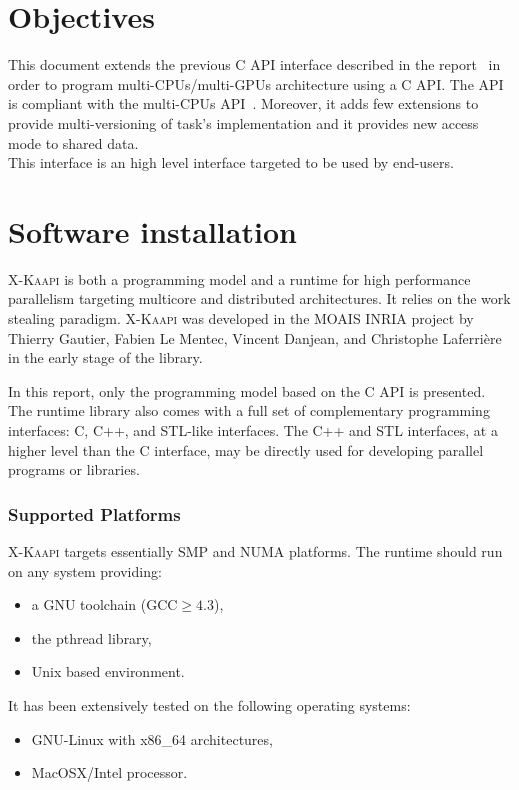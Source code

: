 \documentclass[a4paper, 11pt]{article}
\newcommand{\kaapi}{\textsc{X-Kaapi}\xspace}
\begin{document}
\makeRT %

\tableofcontents
{}

\newpage
\section*{Objectives}\label{sec:objectives}
This document extends the previous C API interface described in the report~\cite{apic} in order to program multi-CPUs/multi-GPUs architecture using a C API. The API is compliant with the multi-CPUs API~\cite{apic}. Moreover, it adds few extensions to provide multi-versioning of task's implementation and it provides new access mode to shared data.\\

This interface is an high level interface targeted to be used by end-users.

\newpage
\section{Software installation}\label{sec:userinstall}

\kaapi is both a programming model and a runtime for high performance parallelism targeting multicore and distributed architectures. 
It relies on the work stealing paradigm.
\kaapi was developed in the MOAIS INRIA project by Thierry Gautier, Fabien Le Mentec, Vincent Danjean, and Christophe Laferrière in the early stage of the library.

In this report, only the programming model based on the C API is presented.
The runtime library also comes with a full set of complementary programming interfaces: C, C++, and STL-like interfaces. The C++ and STL interfaces, at a higher level than the C interface, may be directly used for developing parallel programs or libraries.

\subsubsection*{Supported Platforms}
\kaapi targets essentially SMP and NUMA platforms. The runtime should run
on any system providing:
\begin{itemize}
\item a GNU toolchain ($\textrm{GCC} \ge 4.3$),
\item the pthread library,
\item Unix based environment.
\end{itemize}
It has been extensively tested on the following operating systems:
\begin{itemize}
\item GNU-Linux with x86\_64 architectures,
\item MacOSX/Intel processor.
\end{itemize}
\end{document}
